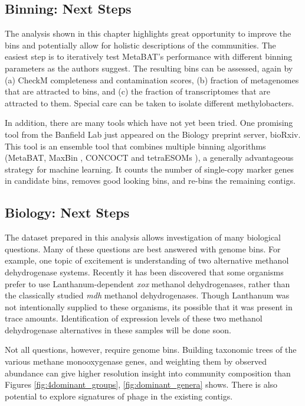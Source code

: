 \subsection{Binning: Next Steps}

The analysis shown in this chapter highlights great opportunity to improve the bins and potentially allow for holistic descriptions of the communities.
The easiest step is to iteratively test MetaBAT's performance with different binning parameters as the authors suggest.
The resulting bins can be assessed, again by (a) CheckM completeness and contamination scores, (b) fraction of metagenomes that are attracted to bins, and (c) the fraction of transcriptomes that are attracted to them.
Special care can be taken to isolate different methylobacters.

In addition, there are many tools which have not yet been tried.
One promising tool from the Banfield Lab \cite{sieber2017} just appeared on the Biology preprint server, bioRxiv.
This tool is an ensemble tool that combines multiple binning algorithms (MetaBAT\cite{metabat2015}, MaxBin \cite{wu2015}, CONCOCT \cite{concoct2014} and tetraESOMs \cite{dick2009}), a generally advantageous strategy for machine learning.
It counts the number of single-copy marker genes in candidate bins, removes good looking bins, and re-bins the remaining contigs.


\subsection{Biology: Next Steps}

The dataset prepared in this analysis allows investigation of many biological questions.
Many of these questions are best answered with genome bins.
For example, one topic of excitement is understanding of two alternative methanol dehydrogenase systems.
Recently it has been discovered that some organisms prefer to use Lanthanum-dependent \textit{xox} methanol dehydrogenases, rather than the classically studied \textit{mdh} methanol dehydrogenases. %
Though Lanthanum was not intentionally supplied to these organisms, its possible that it was present in trace amounts.
Identification of expression levels of these two methanol dehydrogenase alternatives in these samples will be done soon.

Not all questions, however, require genome bins.
Building taxonomic trees of the various methane monooxygenase genes, and weighting them by observed abundance can give higher resolution insight into community composition than Figures \ref{fig:4dominant_groups}, \ref{fig:dominant_genera} shows.
There is also potential to explore signatures of phage in the existing contigs.



